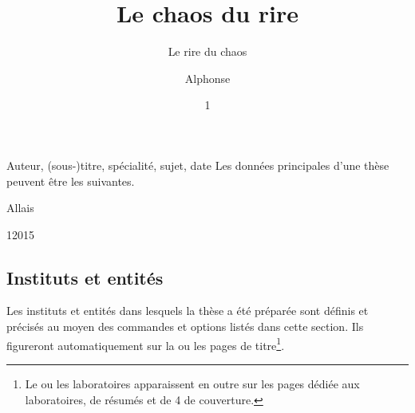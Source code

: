 \begin{dbexample}{Auteur, (sous-)titre, spécialité, sujet, date}{}
  Les données principales d'une thèse peuvent être les suivantes.
  \NoAutoSpacing%
\begin{bodycode}[title=Par exemple dans le \File{\characteristicsfile},listing options={deletekeywords={[2]title}}]
\author[aa@zygo.fr]{Alphonse}{Allais}
\title[Laugh's Chaos]{Le chaos du rire}
\subtitle[Chaos' laugh]{Le rire du chaos}
\date{1}{1}{2015}
\subject{Rire chaotique}
\end{bodycode}
\end{dbexample}

\subsection{Instituts et entités}\label{sec-entites}

Les instituts et entités dans lesquels  la thèse
a été préparée sont définis et précisés au moyen des commandes et options
listés dans cette section. Ils figureront automatiquement sur la ou les pages
de titre\footnote{Le ou les laboratoires apparaissent en outre sur les pages
  dédiée aux laboratoires, de résumés et de 4\ieme{} de couverture.}.

